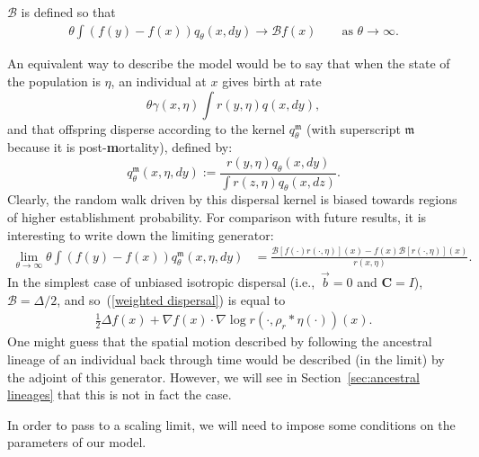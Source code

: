 \documentclass[EJP]{ejpecp} %
\newcommand{\grad}{\nabla}
\newcommand{\DG}{\mathcal{B}}  %
\newcommand{\meanq}{\vec b}    %
\newcommand{\covq}{\mathbf{C}}     %
\newcommand{\kernel}{\rho}  %
\newcommand{\smooth}[1]{\kernel_{#1} \! * \!}  %
\begin{document}
\begin{remark}
    \label{rem:DG_limit}
    $\DG$ is defined so that
    \begin{align*}
        \theta \int \left(
            f(y) - f(x)
        \right) q_\theta(x, dy)
    \to \DG f(x) 
        \qquad \text{as } \theta \to \infty .
    \end{align*}
\end{remark}

\begin{remark}
\label{ancestral lineages: first guess}
An equivalent way to describe the model would be to say that
when the state of the population is $\eta$,
an individual at $x$ gives birth at rate
$$
    \theta \gamma(x, \eta)
    \int r(y, \eta) q(x, dy) ,
$$
and that offspring disperse according to the kernel
$q_\theta^\mathfrak{m}$ (with superscript $\mathfrak{m}$ because it is post-\textbf{m}ortality),
defined by: 
$$
    q_\theta^\mathfrak{m}(x,\eta,dy)
    :=
    \frac{
        r(y, \eta) q_\theta(x, dy)
    }{
        \int r(z, \eta) q_\theta(x, dz)
    } .
$$
Clearly, the random walk driven by this dispersal kernel
is biased towards regions of higher establishment probability.
For comparison with future results,
it is interesting to write down the limiting generator:
\begin{align}
	\label{weighted dispersal}
    \lim_{\theta \to \infty}
    \theta \int (f(y) - f(x)) q_\theta^\mathfrak{m}(x, \eta, dy)
    &=
    \frac{
        \DG\left[ f(\cdot) r(\cdot, \eta) \right](x)
        - 
        f(x) \DG\left[ r(\cdot, \eta) \right](x)
    }{
        r(x, \eta)
    } .
\end{align}
In the simplest case of unbiased isotropic dispersal
(i.e.,~$\meanq = 0$ and $\covq = I$), $\DG = \Delta/2$,
and so~(\ref{weighted dispersal}) is equal to
\begin{align*}
    \frac{1}{2} \Delta f(x) + \grad f(x) \cdot \grad \log r(\cdot, \smooth{r} \eta(\cdot))(x) .
\end{align*}
One might guess that the spatial motion described by following  
the ancestral lineage of an individual 
back through time
would be described (in the limit) by the adjoint of this generator.
However, we will see in Section~\ref{sec:ancestral lineages}
that this is not in fact the case.
\end{remark}

In order to pass to a scaling limit, we will need to impose some 
conditions on the parameters of our model.
\end{document}

